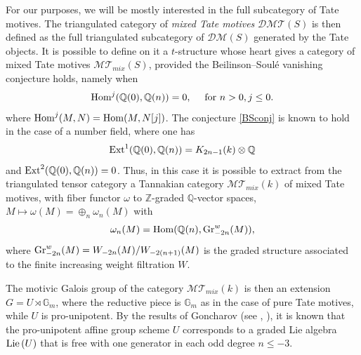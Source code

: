 \documentclass[10pt]{amsart}
\newcommand{\bG}{\mathbb{G}}
\def\Q{{\mathbb Q}}
\def\Z{{\mathbb Z}}
\def\sD{{\mathcal D}}
\def\M{{\mathcal M}}
\def\sT{{\mathcal T}}
\def\text{\hbox}
\def\Ext{{\rm Ext}}
\def\Gr{{\rm Gr}}
\def\Hom{\mathop{\rm Hom}\nolimits}
\numberwithin{equation}{section}
\begin{document}
For our purposes, we will be mostly interested in the full
subcategory of Tate motives.
The triangulated category of {\em mixed Tate motives} $\sD\M\sT(S)$
is then defined as the full triangulated subcategory of $\sD\M(S)$
generated by the Tate objects. It is possible to define on it a
$t$-structure whose heart gives a category of mixed Tate motives
$\M\sT_{mix}(S)$, provided the Beilinson--Soul\'e
vanishing conjecture holds, namely when
\begin{equation}\label{BSconj}
\Hom^j(\Q(0),\Q(n))=0, \ \ \ \text{ for } n>0, j\leq 0.
\end{equation}
where $\Hom^j(M,N)=\Hom(M,N[j])$. The conjecture \eqref{BSconj}
is known to hold in the case of a number field, where one has
\begin{equation}\label{ExtK}
\Ext^1(\Q(0),\Q(n))= K_{2n-1}(k)\otimes \Q
\end{equation}
and $\Ext^2(\Q(0),\Q(n))=0$.
Thus, in this case it is possible to extract from the triangulated tensor
category a Tannakian category $\M\sT_{mix}(k)$ of mixed Tate motives,
with fiber functor $\omega$ to $\Z$-graded $\Q$-vector spaces, $M
\mapsto \omega(M)=\oplus_n \omega_n(M)$ with
\begin{equation}\label{omegaGr}
\omega_n(M)=\Hom(\Q(n),\Gr_{-2n}^w(M)),
\end{equation}
where $\Gr_{-2n}^w(M)=W_{-2n}(M)/W_{-2(n+1)}(M)$ is the graded
structure associated to the finite increasing weight filtration
$W$.

\smallskip

The motivic Galois group of the category $\M\sT_{mix}(k)$ is then an
extension $G=U\rtimes \bG_m$, where the reductive piece is $\bG_m$ as in
the case of pure Tate motives, while $U$ is pro-unipotent. By the
results of Goncharov (see \cite{Gon}, \cite{dg}), it is known that the
pro-unipotent affine group scheme $U$ corresponds to a graded Lie
algebra ${\rm Lie}\, (U)$ that is free with one generator in each odd
degree $n\leq -3$.

\smallskip
\end{document}
